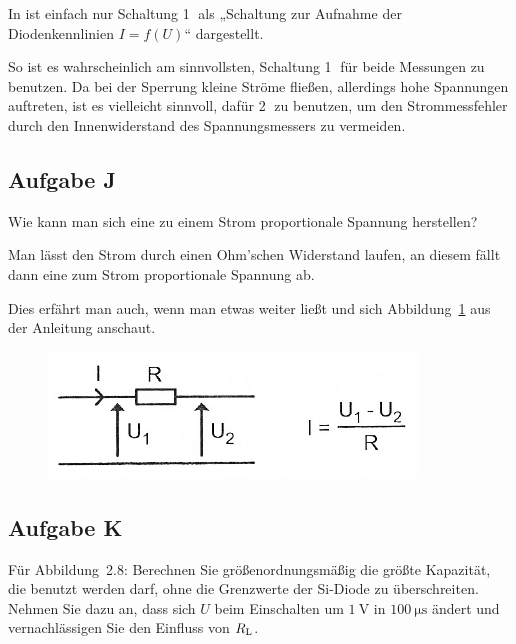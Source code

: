 In \cite[Bild 14.2]{beuth/elementare_elektronik} ist einfach nur Schaltung
\textcircled 1 als „Schaltung zur Aufnahme der Diodenkennlinien $I = f(U)$“
dargestellt.

So ist es wahrscheinlich am sinnvollsten, Schaltung \textcircled 1 für beide
Messungen zu benutzen. Da bei der Sperrung kleine Ströme fließen, allerdings
hohe Spannungen auftreten, ist es vielleicht sinnvoll, dafür \textcircled 2 zu
benutzen, um den Strommessfehler durch den Innenwiderstand des Spannungsmessers
zu vermeiden.

\subsection{Aufgabe J}

\begin{problem}
	Wie kann man sich eine zu einem Strom proportionale Spannung herstellen?
\end{problem}

Man lässt den Strom durch einen Ohm'schen Widerstand laufen, an diesem fällt
dann eine zum Strom proportionale Spannung ab.

Dies erfährt man auch, wenn man etwas weiter ließt und sich
Abbildung~\ref{fig:2-7} aus der Anleitung anschaut.

\begin{figure}[h]
	\centering
	\caption{%
		\cite[Abbildung~2.7]{physik313-Anleitung}
	}
	\label{fig:2-7}
	\includegraphics[width=.6\linewidth]{Bilder_aus_Anleitung/2-7.png}
\end{figure}

\subsection{Aufgabe K}

\begin{problem}
	Für Abbildung~2.8: Berechnen Sie größenordnungsmäßig die größte Kapazität,
	die benutzt werden darf, ohne die Grenzwerte der Si-Diode zu überschreiten.
	Nehmen Sie dazu an, dass sich $U$ beim Einschalten um $\SI{1}\volt$ in
	$\SI{100}{\micro\second}$ ändert und vernachlässigen Sie den Einfluss von
	$R_\text L$.
\end{problem}

